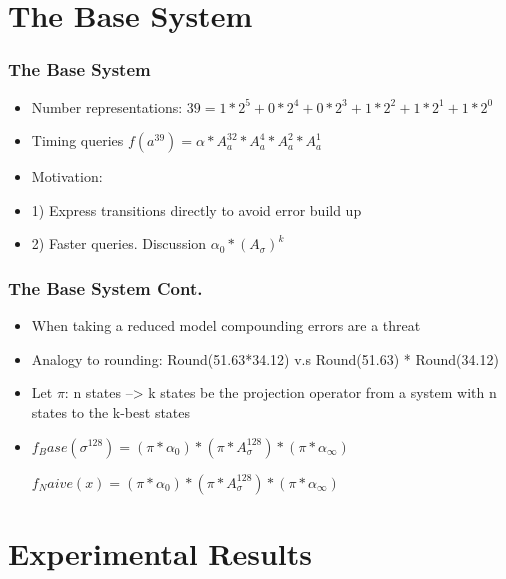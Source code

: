 \documentclass{beamer}
\begin{document}
\section{The Base System}

\begin{frame}
\frametitle{The Base System}
\begin{itemize}

\item Number representations: $39 = 1*2^5 + 0*2^4 + 0*2^3 + 1*2^2 + 1*2^1 + 1*2^0$

\item Timing queries $f(a^39) = \alpha*A_a^32*A_a^4*A_a^2*A_a^1$

\item Motivation: 
\item 1) Express transitions directly to avoid error build up
\item 2) Faster queries. Discussion $\alpha_0*(A_\sigma)^k$
\end{itemize}
\end{frame}


\begin{frame}
\frametitle{The Base System Cont.}
\begin{itemize}

\item When taking a reduced model compounding errors are a threat

\item Analogy to rounding:  Round(51.63*34.12) v.s Round(51.63) * Round(34.12)

\item Let $\pi$: n states --> k states be the projection operator from a system with n states to the k-best states

\item
$f_Base(\sigma^128) = (\pi*\alpha_0)*(\pi*A_\sigma^128)*(\pi*\alpha_\infty)$

$f_Naive(x) = (\pi*\alpha_0)*(\pi*A_\sigma^128)*(\pi*\alpha_\infty)$ 

\end{itemize}

\end{frame}



\section{Experimental Results}
\end{document}
